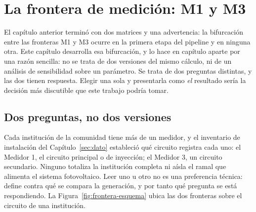 %
%
\section{La frontera de medición: M1 y M3}
\label{sec:frontera}
\justifying

El capítulo anterior terminó con dos matrices y una advertencia: la
bifurcación entre las fronteras M1 y M3 ocurre en la primera etapa del
pipeline y en ninguna otra. Este capítulo desarrolla esa bifurcación, y lo
hace en capítulo aparte por una razón sencilla: no se trata de dos
versiones del mismo cálculo, ni de un análisis de sensibilidad
sobre un parámetro. Se trata de dos preguntas distintas, y las dos tienen
respuesta. Elegir una sola y presentarla como \emph{el} resultado sería la
decisión más discutible que este trabajo podría tomar.

\subsection{Dos preguntas, no dos versiones}
\label{sub:frontera-preguntas}

Cada institución de la comunidad tiene más de un medidor, y el
inventario de instalación del Capítulo~\ref{sec:dato} estableció qué
circuito registra cada uno: el Medidor 1, el circuito principal o de
inyección; el Medidor 3, un circuito secundario. Ninguno totaliza la
institución completa ni aísla el ramal que alimenta el sistema
fotovoltaico. Leer uno u otro no es una preferencia técnica:
define contra qué se compara la generación, y por tanto qué pregunta se
está respondiendo. La Figura~\ref{fig:frontera-esquema} ubica las dos
fronteras sobre el circuito de una institución.

